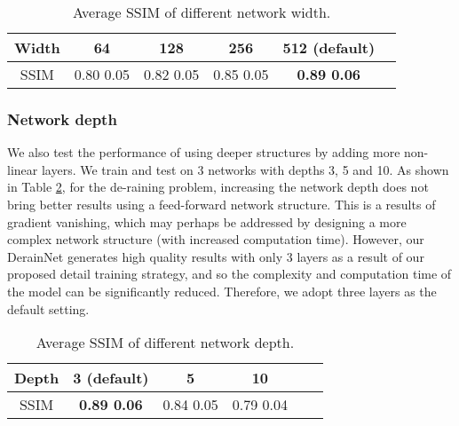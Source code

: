 \documentclass[journal]{IEEEtran}
\begin{document}
\begin{table}[!h]
\caption{Average SSIM of different network width.}
\label{tab.Width}
\centering
\begin{tabular}{|c|c|c|c|c|c|}
\hline
Width &64 & 128 & 256 & 512 (default) \\
\hline
SSIM&0.80  0.05 &  0.82  0.05 & 0.85  0.05 & \textbf{0.89  0.06} \\
\hline
\end{tabular}
\end{table}

\subsubsection{Network depth}
We also test the performance of using deeper structures by adding more non-linear layers. We train and test on 3 networks with depths 3, 5 and 10. As shown in Table \ref{tab.network_depth}, for the de-raining problem, increasing the network depth does not bring better results using a feed-forward network structure. This is a results of gradient vanishing, which may perhaps be addressed by designing a more complex network structure (with increased computation time). However, our DerainNet generates high quality results with only 3 layers as a result of our proposed detail training strategy, and so the complexity and computation time of the model can be significantly reduced. Therefore, we adopt three layers as the default setting.
\begin{table}[t]
\caption{Average SSIM of different network depth.}
\label{tab.network_depth}
\centering
\begin{tabular}{|c|c|c|c|c|c|}
\hline
Depth &3 (default)&5 & 10 \\
\hline
SSIM&\textbf{0.89  0.06} &  0.84  0.05  &0.79  0.04 \\
\hline
\end{tabular}
\end{table}
\end{document}

